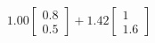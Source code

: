 \documentclass[preview]{standalone}
\begin{document}
\begin{align*}
1.00 \begin{bmatrix} 0.8 \\ 0.5 \end{bmatrix} + 1.42 \begin{bmatrix} 1 \\ 1.6 \end{bmatrix}
\end{align*}
\end{document}
